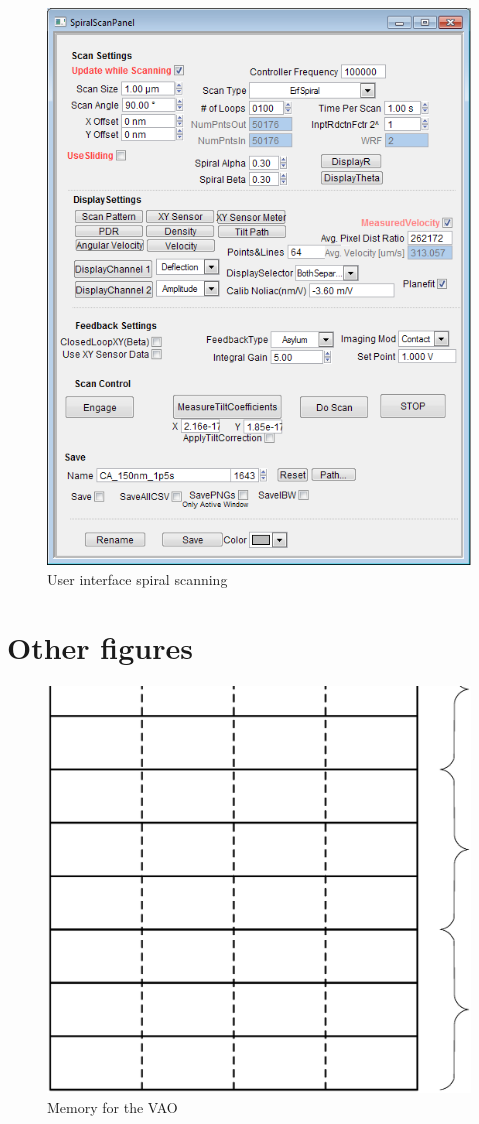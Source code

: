 \begin{figure}[H]
  \centering
  \includegraphics[scale=1]{images/AsylumGUI.png}
    \caption{User interface spiral scanning}
  \label{AsylumGUI}
\end{figure}

\section{Other figures}


\begin{figure}[H]
  \centering
  \includegraphics[scale=0.2]{images/memory.eps}
    \caption{Memory for the VAO}
  \label{memoryVAO}
\end{figure}
